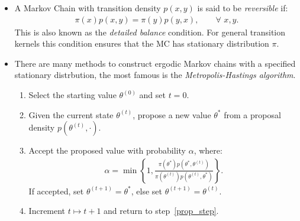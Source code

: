 \documentclass[11pt]{article}
\begin{document}
\begin{itemize}
\begin{itemize}
    \item A Markov Chain with transition density $p(x,y)$ is said to be \emph{reversible} if:
    \begin{align*}
    \pi(x)p(x,y) = \pi(y)p(y,x) , \qquad \forall\,\, x, y .
    \end{align*}
    This is also known as the \emph{detailed balance} condition. For general transition kernels this condition ensures that the MC has stationary distribution $\pi$. 

    \item There are many methods to construct ergodic Markov chains with a specified stationary distrbution, the most famous is the \emph{Metropolis-Hastings algorithm}.       
    \begin{enumerate}
    \item Select the starting value $\theta^{(0)}$ and set $t=0$.
    \item\label{prop_step} Given the current state $\theta^{(t)}$, propose a new value $\theta^{*}$ from a proposal density $p(\theta^{(t)},\cdot)$.
    \item Accept the proposed value with probability $\alpha$, where:
    \begin{align*}
    \alpha = \min \left\{ 1 , \frac{\pi(\theta^{*})p(\theta^{*},\theta^{(t)})}{\pi(\theta^{(t)})p(\theta^{(t)},\theta^{*})} \right\} .
    \end{align*}
    If accepted, set $\theta^{(t+1)}=\theta^{*}$, else set $\theta^{(t+1)}=\theta^{(t)}$. 
    \item Increment $t\mapsto{}t+1$ and return to step~\ref{prop_step}. 
    \end{enumerate}


\end{itemize}
\end{itemize}
\end{document}
